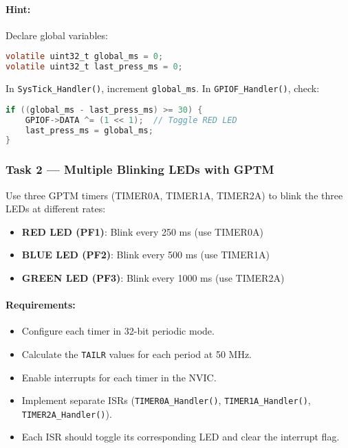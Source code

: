 \paragraph{Hint:}
Declare global variables:
\begin{lstlisting}[language=C]
volatile uint32_t global_ms = 0;
volatile uint32_t last_press_ms = 0;
\end{lstlisting}

\noindent
In \texttt{SysTick\_Handler()}, increment \texttt{global\_ms}. In \texttt{GPIOF\_Handler()}, check:
\begin{lstlisting}[language=C]
if ((global_ms - last_press_ms) >= 30) {
    GPIOF->DATA ^= (1 << 1);  // Toggle RED LED
    last_press_ms = global_ms;
}
\end{lstlisting}

\subsubsection{Task 2 — Multiple Blinking LEDs with GPTM}

Use three GPTM timers (TIMER0A, TIMER1A, TIMER2A) to blink the three LEDs at different rates:

\begin{itemize}[nosep]
  \item \textbf{RED LED (PF1)}: Blink every 250 ms (use TIMER0A)
  \item \textbf{BLUE LED (PF2)}: Blink every 500 ms (use TIMER1A)
  \item \textbf{GREEN LED (PF3)}: Blink every 1000 ms (use TIMER2A)
\end{itemize}

\paragraph{Requirements:}
\begin{itemize}[nosep]
  \item Configure each timer in 32-bit periodic mode.
  \item Calculate the \texttt{TAILR} values for each period at 50 MHz.
  \item Enable interrupts for each timer in the NVIC.
  \item Implement separate ISRs (\texttt{TIMER0A\_Handler()}, \texttt{TIMER1A\_Handler()}, \texttt{TIMER2A\_Handler()}).
  \item Each ISR should toggle its corresponding LED and clear the interrupt flag.
\end{itemize}
